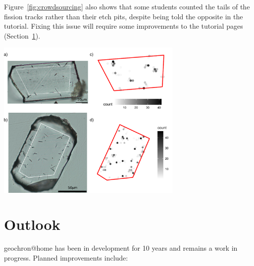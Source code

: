 \documentclass[gchron, manuscript]{copernicus}
\begin{document}
Figure~\ref{fig:crowdsourcing} also shows that some students counted
the tails of the fission tracks rather than their etch pits, despite
being told the opposite in the tutorial. Fixing this issue will
require some improvements to the tutorial pages
(Section~\ref{sec:outlook}).

{  \centering
  \includegraphics[width=9cm]{4649vs4673.pdf}
  \label{fig:crowdsourcing}
}%

\section{Outlook}\label{sec:outlook}

geochron@home has been in development for 10 years and
remains a work in progress. Planned improvements include:
\end{document}
